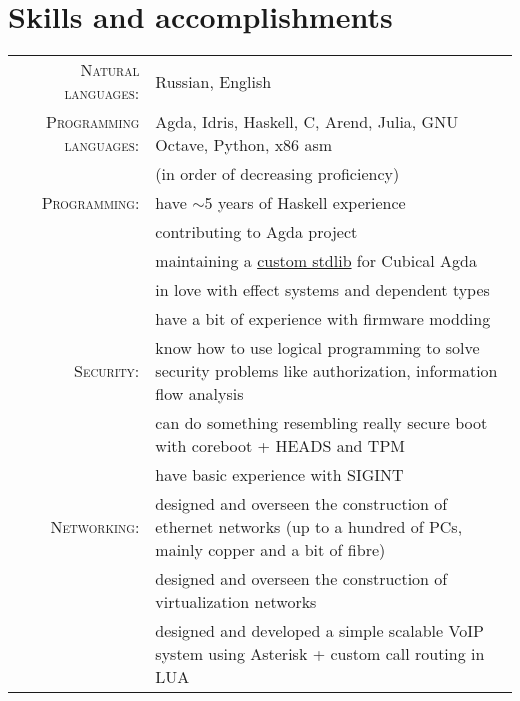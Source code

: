 \documentclass[a4paper,11pt]{article}
\begin{document}
  \section{Skills and accomplishments}
    \begin{longtable}{rp{}}
      \textsc{Natural languages:} & Russian, English \\

      \textsc{Programming languages:} & Agda, Idris, Haskell, C, Arend, Julia, GNU Octave, Python, x86 asm  \\
                                      & (in order of decreasing proficiency)                                \\

      \textsc{Programming:} & have $\sim$5 years of Haskell experience                                                      \\
                            & contributing to Agda project                                                                  \\
                            & maintaining a \href{https://github.com/cmcmA20/cubical-mini}{custom stdlib} for Cubical Agda  \\
                            & in love with effect systems and dependent types                                               \\
                            & have a bit of experience with firmware modding                                                \\

      \textsc{Security:} & know how to use logical programming to solve security problems like authorization, information flow analysis  \\
                         & can do something resembling really secure boot with coreboot + HEADS and TPM                                  \\
                         & have basic experience with SIGINT                                                                             \\

      \textsc{Networking:} & designed and overseen the construction of ethernet
                             networks (up to a hundred of PCs, mainly copper and a bit of fibre)  \\
                           & designed and overseen the construction of virtualization
                             networks                                                             \\
                           & designed and developed a simple scalable VoIP system
                             using Asterisk + custom call routing in LUA                          \\


\end{longtable}
\end{document}
